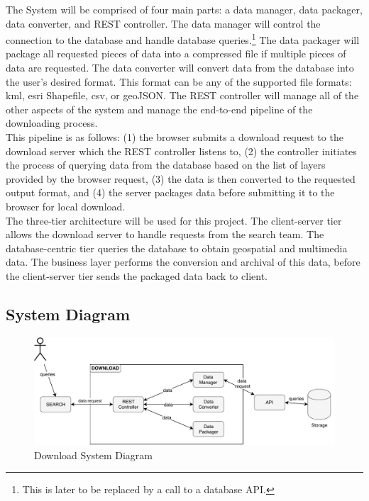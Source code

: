 \documentclass{article}
\begin{document}
The System will be comprised of four main parts: a data manager, data packager, data converter, and REST controller. The data manager will control the connection to the database and handle database queries.\footnote{This is later to be replaced by a call to a database API.} The data packager will package all requested pieces of data into a compressed file if multiple pieces of data are requested. The data converter will convert data from the database into the user's desired format. This format can be any of the supported file formats: kml, esri Shapefile, csv, or geoJSON. The REST controller will manage all of the other aspects of the system and manage the end-to-end pipeline of the downloading process. \\

This pipeline is as follows: (1) the browser submits a download request to the download server which the REST controller listens to, (2) the controller initiates the process of querying data from the database based on the list of layers provided by the browser request, (3) the data is then converted to the requested output format, and (4) the server packages data before submitting it to the browser for local download. \\ 

The three-tier architecture will be used for this project. The client-server tier allows the download server to handle requests from the search team. The database-centric tier queries the database to obtain geospatial and multimedia data. The business layer performs the conversion and archival of this data, before the client-server tier sends the packaged data back to client.   

\subsection{System Diagram}

\begin{figure}[H]
	\begin{center}
		\caption{Download System Diagram}
		\includegraphics[width=\textwidth]{images/component.pdf}
	\end{center}
\end{figure}
\end{document}
